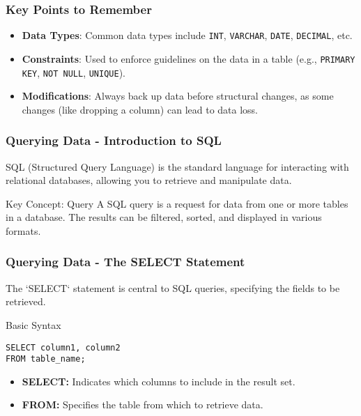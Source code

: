 \documentclass[aspectratio=169]{beamer}
\begin{document}
\begin{frame}[fragile]
    \frametitle{Key Points to Remember}
    
    \begin{itemize}
        \item \textbf{Data Types}: Common data types include \texttt{INT}, \texttt{VARCHAR}, \texttt{DATE}, \texttt{DECIMAL}, etc.
        \item \textbf{Constraints}: Used to enforce guidelines on the data in a table (e.g., \texttt{PRIMARY KEY}, \texttt{NOT NULL}, \texttt{UNIQUE}).
        \item \textbf{Modifications}: Always back up data before structural changes, as some changes (like dropping a column) can lead to data loss.
    \end{itemize}
\end{frame}

\begin{frame}[fragile]
    \frametitle{Querying Data - Introduction to SQL}
    SQL (Structured Query Language) is the standard language for interacting with relational databases, allowing you to retrieve and manipulate data.

    \begin{block}{Key Concept: Query}
        A SQL query is a request for data from one or more tables in a database. The results can be filtered, sorted, and displayed in various formats.
    \end{block}
\end{frame}

\begin{frame}[fragile]
    \frametitle{Querying Data - The SELECT Statement}
    The `SELECT` statement is central to SQL queries, specifying the fields to be retrieved.

    \begin{block}{Basic Syntax}
        \begin{lstlisting}
SELECT column1, column2
FROM table_name;
        \end{lstlisting}
    \end{block}

    \begin{itemize}
        \item \textbf{SELECT:} Indicates which columns to include in the result set.
        \item \textbf{FROM:} Specifies the table from which to retrieve data.
    \end{itemize}
\end{frame}
\end{document}
